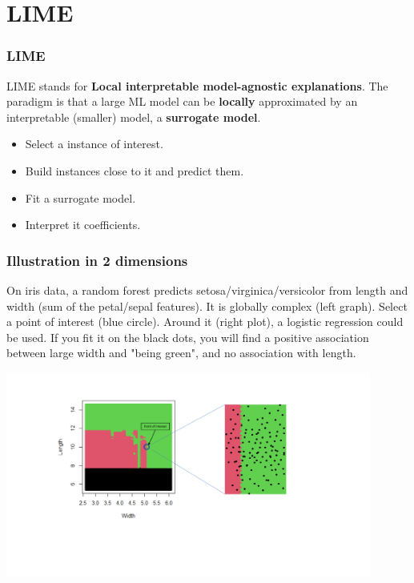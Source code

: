 \section{LIME}
\begin{frame}
\frametitle{LIME}
LIME stands for {\bf Local interpretable model-agnostic explanations}. The paradigm is that a large ML model can be {\bf locally} approximated by an interpretable (smaller) model, a {\bf surrogate model}. 
\begin{itemize}
\item Select a instance of interest.
\item Build instances close to it and predict them.
\item Fit a surrogate model.
\item Interpret it coefficients.
\end{itemize}
\end{frame}
\begin{frame}
\frametitle{Illustration in 2 dimensions}
\small
On iris data, a random forest predicts setosa/virginica/versicolor from length and width (sum of the petal/sepal features). It is globally complex (left graph). Select a point of interest (blue circle). Around it (right plot), a logistic regression could be used. If you fit it on the black dots, you will find a positive association between large width and "being green", and no association with length. 
\normalsize
\begin{center}
\includegraphics[width=12cm, page=2]{../Graphs/LIME_illustr.png}
\end{center}
\end{frame}
